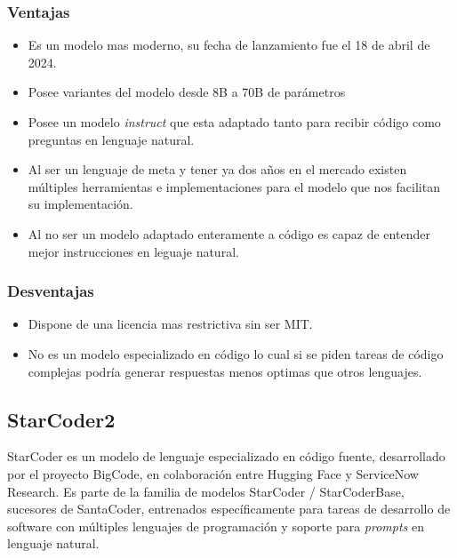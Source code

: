 \subsubsection{Ventajas}
\begin{itemize}
	\item Es un modelo mas moderno, su fecha de lanzamiento fue el 18 de abril de 2024.
	\item Posee variantes del modelo desde 8B a 70B de parámetros 
    \item Posee un modelo \textit{instruct} que esta adaptado tanto para recibir código como preguntas en lenguaje natural.
    \item Al ser un lenguaje de meta y tener ya dos años en el mercado existen múltiples herramientas e implementaciones para el modelo que nos facilitan su implementación.
    \item Al no ser un modelo adaptado enteramente a código es capaz de entender mejor instrucciones en leguaje natural.
\end{itemize}
\subsubsection{Desventajas}
\begin{itemize}
    \item Dispone de una licencia mas restrictiva sin ser MIT.
    \item No es un modelo especializado en código lo cual si se piden tareas de código complejas podría generar respuestas menos optimas que otros lenguajes.
\end{itemize}
\subsection{StarCoder2}
StarCoder es un modelo de lenguaje especializado en código fuente, desarrollado por el proyecto BigCode, en  colaboración entre Hugging Face y ServiceNow Research. Es parte de la familia de modelos StarCoder / StarCoderBase, sucesores de SantaCoder, entrenados específicamente para tareas de desarrollo de software con múltiples lenguajes de programación y soporte para \textit{prompts} en lenguaje natural.
